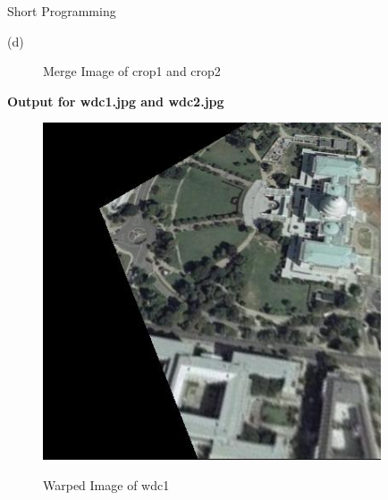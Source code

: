 \documentclass[a4paper,12pt]{article}
\begin{document}
\begin{section}{Short Programming}
\begin{subsection}{(d)}
\begin{figure}[!htb]
        \caption{Merge Image of crop1 and crop2}
      \end{figure}
      
      
      
\textbf{Output for wdc1.jpg and wdc2.jpg}\\

 \begin{figure}[!htb]
       \center
       {\includegraphics[width=10cm]
       {wdc_warp.png}}
        \caption{Warped Image of wdc1}
      \end{figure}




\end{subsection}
\end{section}
\end{document}
